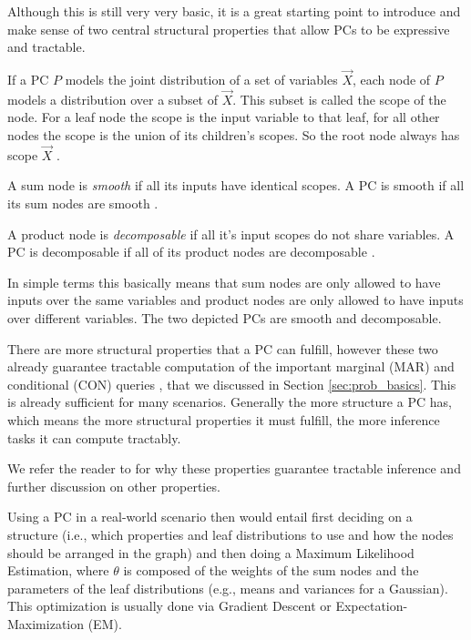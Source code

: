 Although this is still very very basic, it is a great starting point to introduce and make sense of two central structural 
properties that allow PCs to be expressive and tractable. 

\begin{definition}[Scope]
    If a PC $P$ models the joint distribution of a set of variables $\vec{X}$, each node of $P$ models a distribution over a subset of $\vec{X}$.
    This subset is called the scope of the node. For a leaf node the scope is the input variable to that leaf, for all other nodes the scope 
    is the union of its children's scopes. So the root node always has scope $\vec{X}$ \cite{pc_intro}.
\end{definition}

\begin{definition}[Smoothness]
    A sum node is \textit{smooth} if all its inputs have identical scopes. A PC is smooth if all its sum nodes are smooth \cite{pc_intro}.
\end{definition}
\begin{definition}[Decomposability]
    A product node is \textit{decomposable} if all it's input scopes do not share variables. A PC is decomposable if all of its product nodes are decomposable \cite{pc_intro}.
\end{definition}

In simple terms this basically means that sum nodes are only allowed to have inputs over the same variables and product nodes are
only allowed to have inputs over different variables. The two depicted PCs are smooth and decomposable.

There are more structural properties that a PC can fulfill, however these two already guarantee tractable computation of the important
marginal (MAR) and conditional (CON) queries \cite{pc_intro}, that we discussed in Section \ref{sec:prob_basics}. This is already sufficient for many scenarios. 
Generally the more structure a PC has, which means the more structural properties it must fulfill, the more inference tasks it can compute 
tractably. 

We refer the reader to \cite{pc_intro} for why these properties guarantee tractable inference 
and further discussion on other properties.

Using a PC in a real-world scenario then would entail first deciding on a structure (i.e., which properties and leaf 
distributions to use and how the nodes should be arranged in the graph) and then doing a Maximum Likelihood 
Estimation, where $\theta$ is composed of the weights of the sum nodes and the parameters of the leaf distributions (e.g., means and variances for a Gaussian). 
This optimization is usually done via Gradient Descent or Expectation-Maximization (EM).

